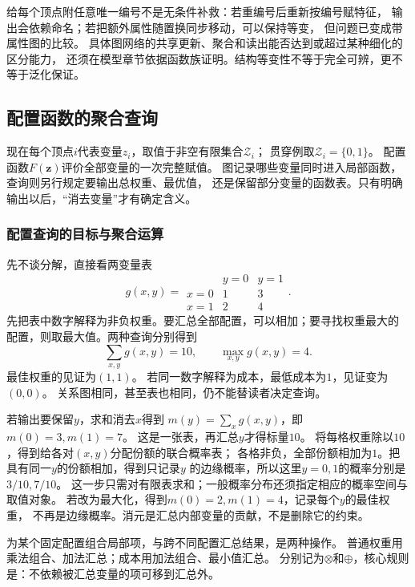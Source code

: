 给每个顶点附任意唯一编号不是无条件补救：若重编号后重新按编号赋特征，
输出会依赖命名；若把额外属性随置换同步移动，可以保持等变，
但问题已变成带属性图的比较。
具体图网络的共享更新、聚合和读出能否达到或超过某种细化的区分能力，
还须在模型章节依据函数族证明。结构等变性不等于完全可辨，更不等于泛化保证。

\subsection{配置函数的聚合查询}
\label{sec:graph-theory-semiring-dynamic-programming}

现在每个顶点\(i\)代表变量\(z_i\)，取值于非空有限集合\(\mathcal Z_i\)；
贯穿例取\(\mathcal Z_i=\{0,1\}\)。
配置函数\(F(\bm z)\)评价全部变量的一次完整赋值。
图记录哪些变量同时进入局部函数，查询则另行规定要输出总权重、最优值，
还是保留部分变量的函数表。只有明确输出以后，“消去变量”才有确定含义。

\subsubsection{配置查询的目标与聚合运算}

先不谈分解，直接看两变量表
\[
  g(x,y)=
  \begin{array}{c|cc}
    &y=0&y=1\\ \hline
    x=0&1&3\\
    x=1&2&4
  \end{array}.
\]
先把表中数字解释为非负权重。要汇总全部配置，可以相加；要寻找权重最大的
配置，则取最大值。两种查询分别得到
\[
  \sum_{x,y}g(x,y)=10,\qquad \max_{x,y}g(x,y)=4.
\]
最佳权重的见证为\((1,1)\)。
若同一数字解释为成本，最低成本为\(1\)，见证变为\((0,0)\)。
关系图相同，甚至表也相同，仍不能替读者决定查询。

若输出要保留\(y\)，求和消去\(x\)得到
\(m(y)=\sum_xg(x,y)\)，即\(m(0)=3,m(1)=7\)。
这是一张表，再汇总\(y\)才得标量\(10\)。
将每格权重除以\(10\)，得到给各对\((x,y)\)分配份额的联合概率表；
各格非负，全部份额相加为\(1\)。把具有同一\(y\)的份额相加，得到只记录\(y\)
的边缘概率，所以这里\(y=0,1\)的概率分别是\(3/10,7/10\)。
这一步只需对有限表求和；一般概率分布还须指定相应的概率空间与取值对象。
若改为最大化，得到\(m(0)=2,m(1)=4\)，记录每个\(y\)的最佳权重，
不再是边缘概率。消元是汇总内部变量的贡献，不是删除它的约束。

为某个固定配置组合局部项，与跨不同配置汇总结果，是两种操作。
普通权重用乘法组合、加法汇总；成本用加法组合、最小值汇总。
分别记为\(\otimes\)和\(\oplus\)，核心规则是：不依赖被汇总变量的项可移到汇总外。

